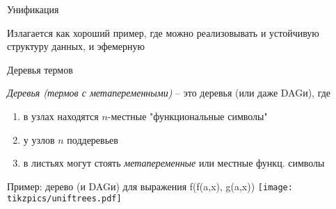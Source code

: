 \begin{frame}{Унификация}
\begin{center}
\Large
Излагается как хороший пример, где можно реализовывать и устойчивую структуру данных, и эфемерную

\end{center}
\end{frame}

\begin{frame}{Деревья термов}
\begin{definition}[]
\emph{Деревья (термов с метапеременными)} -- это деревья (или даже DAGи), где 
\begin{enumerate}
\item в узлах находятся $n$-местные "функциональные символы"
\item у узлов $n$ поддеревьев
\item в листьях могут стоять \emph{метапеременные} или местные функц. символы
\end{enumerate}
\end{definition}

\begin{center}
Пример: дерево (и DAGи) для выражения f(f(a,x), g(a,x))
\texttt{[image: tikzpics/uniftrees.pdf]}
\end{center}
\end{frame}

